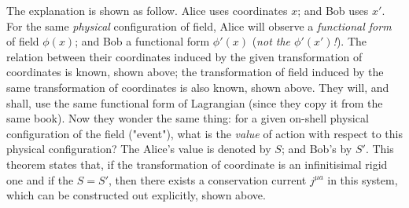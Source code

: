 \documentclass[]{article}
\begin{document}
The explanation is shown as follow. Alice uses coordinates $x$; and Bob uses $x'$. For the same {\it physical} configuration of field, Alice will observe a {\it functional form} of field $\phi(x)$; and Bob a functional form $\phi'(x)$ ({\it not the $\phi'(x')$!}). The relation between their coordinates induced by the given transformation of coordinates is known, shown above; the transformation of field induced by the same transformation of coordinates is also known, shown above. They will, and shall, use the same functional form of Lagrangian (since they copy it from the same book). Now they wonder the same thing: for a given on-shell physical configuration of the field ("event"), what is the {\it value} of action with respect to this physical configuration? The Alice's value is denoted by $S$; and Bob's by $S'$. This theorem states that, if the transformation of coordinate is an infinitisimal rigid one and if the $S = S'$, then there exists a conservation current $j^{\mu a}$ in this system, which can be constructed out explicitly, shown above.
\end{document}
